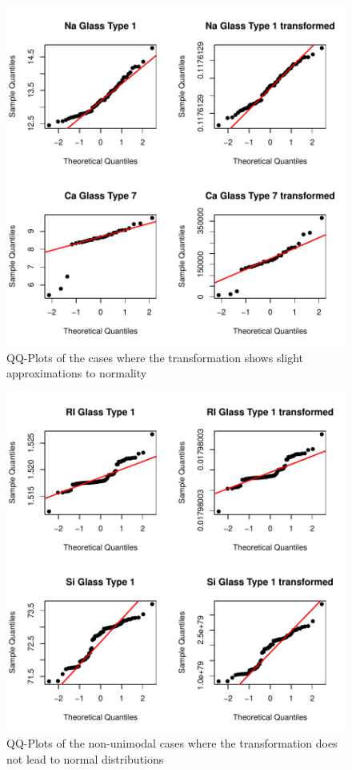 \documentclass[a4paper, 12pt, titlepage, headsepline, listof = totoc, bibliography = totoc, numbers = noenddot]{scrartcl}
\begin{document}
\begin{figure}[h!]
\centering
\includegraphics[width=\textwidth]{report-QQtrans}
\caption{QQ-Plots of the cases where the transformation shows slight approximations to normality}
\label{fig:QQtrans}
\end{figure}

\begin{figure}[h!]
\centering
\includegraphics[width=\textwidth]{report-QQtransno}
\caption{QQ-Plots of the non-unimodal cases where the transformation does not lead to normal distributions}
\label{fig:QQtransno}
\end{figure}
\end{document}
